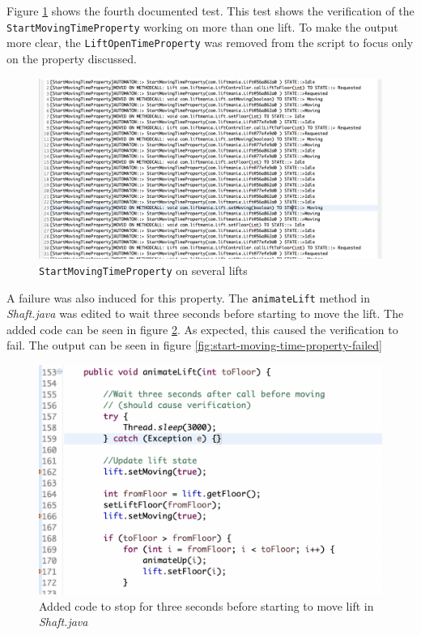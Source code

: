 \documentclass[a4paper, 12pt]{article}
\begin{document}
Figure \ref{fig:start-moving-time-property-several} shows the fourth documented test. This test shows the verification of the \texttt{StartMovingTimeProperty} working on more than one lift. To make the output more clear, the \texttt{LiftOpenTimeProperty} was removed from the script to focus only on the property discussed. \\
\begin{figure}[h]
   \centering
   \includegraphics[width=\textwidth,height=\textheight,keepaspectratio]{images/start-moving-time-property-several} %
   \caption{\texttt{StartMovingTimeProperty} on several lifts}
   \label{fig:start-moving-time-property-several}
\end{figure}

A failure was also induced for this property. The \texttt{animateLift} method in \textit{Shaft.java} was edited to wait three seconds before starting to move the lift. The added code can be seen in figure \ref{fig:start-moving-time-property-failure-edit}. As expected, this caused the verification to fail. The output can be seen in figure \ref{fig:start-moving-time-property-failed}

\begin{figure}[h]
   \centering
   \includegraphics[width=\textwidth,height=\textheight,keepaspectratio]{images/start-moving-time-property-failure-edit} %
   \caption{Added code to stop for three seconds before starting to move lift in \textit{Shaft.java}}
   \label{fig:start-moving-time-property-failure-edit}
\end{figure}
\end{document}
